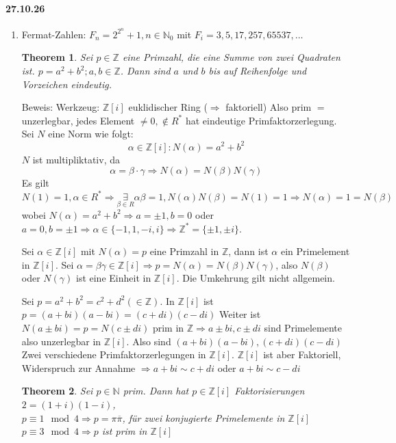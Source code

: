 \documentclass{article}
\newcommand{\N}{\mathbb{N}}
\newcommand{\Z}{\mathbb{Z}}
\newtheorem{thm}{Theorem}[section]
\begin{document}
\paragraph{27.10.26}
\begin{enumerate}[1.]
    \item
        Fermat-Zahlen: $F_n=2^{2^n}+1,n\in\N_0$
        mit $F_i=3,5,17,257,65537,\hdots$
        \begin{thm}
            Sei $p\in\Z$ eine Primzahl, die eine Summe
            von zwei Quadraten ist. $p=a^2+b^2;a,b\in\Z$.
            Dann sind $a$ und $b$ bis auf Reihenfolge
            und Vorzeichen eindeutig.
        \end{thm}
        Beweis:
        Werkzeug: $\Z[i]$ euklidischer Ring ($\Rightarrow$
        faktoriell) Also prim $=$ unzerlegbar, jedes
        Element $\neq 0,\notin R^*$ hat eindeutige
        Primfaktorzerlegung. Sei $N$ eine Norm
        wie folgt:
        \begin{equation*}
            \alpha\in\Z[i]:N(\alpha)=a^2+b^2
        \end{equation*}
        $N$ ist multipliktativ, da
        \begin{equation*}
            \alpha=\beta\cdot\gamma\Rightarrow
            N(\alpha)=N(\beta)N(\gamma)
        \end{equation*}
        Es gilt $N(1)=1,\alpha\in R^*\Rightarrow\underset
        {\beta\in R}\exists \alpha\beta=1,N(\alpha)N(\beta)
        =N(1)=1\Rightarrow N(\alpha)=1=N(\beta)$ wobei
        $N(\alpha)=a^2+b^2\Rightarrow a=\pm 1,b=0$
        oder $a=0,b=\pm 1\Rightarrow\alpha\in\{-1,1,-i,i\}
        \Rightarrow \Z^*=\{\pm 1,\pm i\}$.

        Sei $\alpha\in\Z[i]$ mit $N(\alpha)=p$ eine
        Primzahl in $\Z$, dann ist $\alpha$ ein Primelement
        in $\Z[i]$. Sei $\alpha=\beta\gamma\in\Z[i]
        \Rightarrow p=N(\alpha)=N(\beta)N(\gamma)$,
        also $N(\beta)$ oder $N(\gamma)$ ist eine Einheit
        in $\Z[i]$.
        Die Umkehrung gilt nicht allgemein.

        Sei $p=a^2+b^2=c^2+d^2(\in\Z)$. In $\Z[i]$ ist
        $p=(a+bi)(a-bi)=(c+di)(c-di)$ Weiter ist
        $N(a\pm bi)=p=N(c\pm di)$ prim in $\Z\Rightarrow
        a\pm bi,c\pm di$ sind Primelemente also unzerlegbar
        in $\Z[i]$. Also sind $(a+bi)(a-bi),(c+di)(c-di)$
        Zwei verschiedene Primfaktorzerlegungen in $\Z[i]$.
        $\Z[i]$ ist aber Faktoriell, Widerspruch zur Annahme
        $\Rightarrow a+bi\sim c+di$ oder $a+bi\sim c-di$
        \begin{thm}
            Sei $p\in\N$ prim. Dann hat $p\in\Z[i]$
            Faktorisierungen $2=(1+i)(1-i)$,\\
            $p\equiv 1\mod 4\Rightarrow p=\pi\overline{\pi}$,
            für zwei konjugierte Primelemente in $\Z[i]$\\
            $p\equiv 3\mod 4\Rightarrow p$ ist prim
            in $\Z[i]$
        \end{thm}
\end{enumerate}
\end{document}
